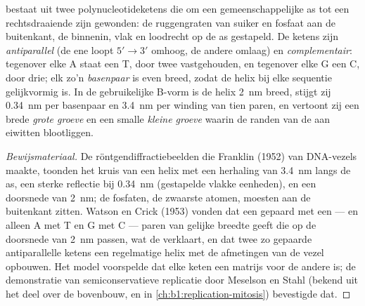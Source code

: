\begin{theorem}\label{thm:b1:nucleic-acids:helix}
 bestaat uit twee polynucleotideketens die om een gemeenschappelijke as tot een
rechtsdraaiende \emph{} zijn gewonden: de ruggengraten van suiker en
fosfaat aan de buitenkant, de  binnenin, vlak en loodrecht op de as
gestapeld. De ketens zijn \emph{antiparallel} (de ene loopt $5' \to 3'$ omhoog, de
andere omlaag) en \emph{complementair}: tegenover elke A staat een T, door twee
 vastgehouden, en tegenover elke G een C, door drie; elk zo'n
\emph{basenpaar} is even breed, zodat de helix bij elke sequentie gelijkvormig is.
In de gebruikelijke B-vorm is de helix \qty{2}{nm} breed, stijgt zij
\qty{0.34}{nm} per basenpaar en \qty{3.4}{nm} per winding van tien paren, en
vertoont zij een brede \emph{grote groeve} en een smalle \emph{kleine groeve}
waarin de randen van de  aan eiwitten blootliggen.
\end{theorem}
\begin{proof}[Bewijsmateriaal]
De röntgendiffractiebeelden die Franklin (1952) van DNA-vezels maakte, toonden het
kruis van een helix met een herhaling van \qty{3.4}{nm} langs de as, een sterke
reflectie bij \qty{0.34}{nm} (gestapelde vlakke eenheden), en een doorsnede van
\qty{2}{nm}; de fosfaten, de zwaarste atomen, moesten aan de buitenkant zitten.
Watson en Crick (1953) vonden dat een  gepaard met een  --- en
alleen A met T en G met C --- paren van gelijke breedte geeft die op de doorsnede
van \qty{2}{nm} passen, wat de  verklaart, en dat twee zo
gepaarde antiparallelle ketens een regelmatige helix met de afmetingen van de vezel
opbouwen. Het model voorspelde dat elke keten een matrijs voor de andere is; de
demonstratie van semiconservatieve replicatie door Meselson en Stahl (bekend uit
het deel over de bovenbouw, en in \cref{ch:b1:replication-mitosis}) bevestigde dat.
\end{proof}

